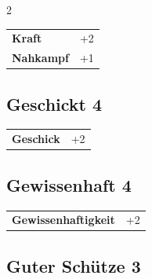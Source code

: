 \begin{multicols}{2}
\begin{tcolorbox}
\vspace{3mm}

\begin{tabular}{@{}ll@{}}
    \textbf{Kraft} & +2\\
    \textbf{Nahkampf} & +1\\
\end{tabular}


\end{tcolorbox}

\begin{tcolorbox}
    \subsection*{Geschickt \hfill \small{4 }}
    \tcblower




\begin{tabular}{@{}ll@{}}
    \textbf{Geschick} & +2\\
\end{tabular}


\end{tcolorbox}

\begin{tcolorbox}
    \subsection*{Gewissenhaft \hfill \small{4 }}
    \tcblower




\begin{tabular}{@{}ll@{}}
    \textbf{Gewissenhaftigkeit} & +2\\
\end{tabular}


\end{tcolorbox}

\begin{tcolorbox}
    \subsection*{Guter Schütze \hfill \small{3 }}
    \tcblower





\end{tcolorbox}
\end{multicols}
